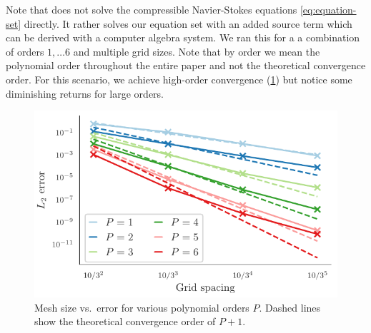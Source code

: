 \documentclass[runningheads]{llncs}
\begin{document}
Note that  does not solve the compressible Navier-Stokes equations \cref{eq:equation-set} directly.
It rather solves our equation set with an added source term which can be derived with a computer algebra system.
We ran this for a a combination of orders $1, \ldots 6$ and multiple grid sizes.
Note that by order we mean the polynomial order throughout the entire paper and not the theoretical convergence order.
For this scenario, we achieve high-order convergence (\cref{fig:convergence-test}) but notice some diminishing returns for large orders.
\begin{figure}[tb]
  \centering
  \includegraphics{paper_convergence}
  \caption{\label{fig:convergence-test}Mesh size vs.\ error for various polynomial orders $P$.
    Dashed lines show the theoretical convergence order of $P+1$.}
\end{figure}
\end{document}
